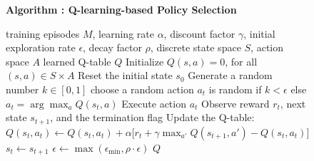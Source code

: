 \begin{figure}[t]
  \centering
  \label{alg:qlearning_policy}
  \begin{minipage}{0.96\textwidth}
  \textbf{Algorithm \thealgorithm: Q-learning-based Policy Selection}
  \vspace{0.4em}
  \begin{algorithmic}[1]
  \Require training episodes \(M\), learning rate \(\alpha\), discount factor \(\gamma\), initial exploration rate \(\epsilon\), decay factor \(\rho\), discrete state space \(S\), action space \(A\)
  \Ensure learned Q-table \(Q\)
  \State Initialize \(Q(s,a)=0\), for all \((s,a)\in S\times A\)
      \State Reset the initial state \(s_0\)
          \State Generate a random number $k \in [0,1]$
          \State choose a random action \(a_t\) is random if $k<\epsilon$ else \(a_t=\arg\max_a Q(s_t,a)\)
          \State Execute action \(a_t\)
          \State Observe reward \(r_t\), next state \(s_{t+1}\), and the termination flag
          \State Update the Q-table:
          \State $Q(s_t,a_t)\leftarrow Q(s_t,a_t)+\alpha\bigl[r_t+\gamma \max_{a'}Q(s_{t+1},a')-Q(s_t,a_t)\bigr]$
          \State \(s_t \leftarrow s_{t+1}\)
      \EndWhile
      \State \(\epsilon \leftarrow \max(\epsilon_{\min}, \rho\cdot \epsilon)\)
  \EndFor
  \State \Return \(Q\)
  \end{algorithmic}
  \end{minipage}
\end{figure}


